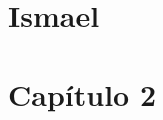 \documentclass[a4paper,12pt]{book}
\begin{document}


\tableofcontents
\newpage

\chapter{Ismael}


\chapter{Capítulo 2}


\newpage

\end{document}

